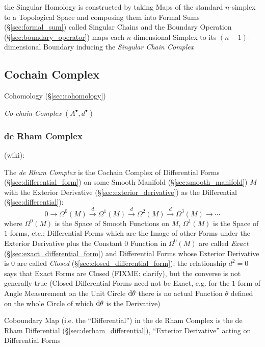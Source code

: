 the Singular Homology is constructed by taking Maps of the standard $n$-simplex
to a Topological Space and composing them into Formal
Sums (\S\ref{sec:formal_sum}) called Singular Chains and the Boundary Operation
(\S\ref{sec:boundary_operator}) maps each $n$-dimensional Simplex to its
$(n-1)$-dimensional Boundary inducing the \emph{Singular Chain Complex}



\subsection{Cochain Complex}\label{sec:cochain_complex}

\fist Cohomology (\S\ref{sec:cohomology})

\emph{Co-chain Complex} $(A^\bullet, d^\bullet)$



\subsubsection{de Rham Complex}\label{sec:derham_complex}

(wiki):

The \emph{de Rham Complex} is the Cochain Complex of Differential Forms
(\S\ref{sec:differential_form}) on some Smooth Manifold
(\S\ref{sec:smooth_manifold}) $M$ with the Exterior Derivative
(\S\ref{sec:exterior_derivative}) as the Differential
(\S\ref{sec:differential}):
\[
  0 \rightarrow \Omega^0(M) \xrightarrow{d} \Omega^1(M) \xrightarrow{d}
  \Omega^2(M) \xrightarrow{d} \Omega^3(M) \rightarrow \cdots
\]
where $\Omega^0(M)$ is the Space of Smooth Functions on $M$, $\Omega^1(M)$ is
the Space of $1$-forms, etc.; Differential Forms which are the Image of other
Forms under the Exterior Derivative plus the Constant $0$ Function in
$\Omega^0(M)$ are called \emph{Exact} (\S\ref{sec:exact_differential_form}) and
Differential Forms whose Exterior Derivative is $0$ are called \emph{Closed}
(\S\ref{sec:closed_differential_form}); the relationship $d^2 = 0$ says that
Exact Forms are Closed (FIXME: clarify), but the converse is not generally true
(Closed Differential Forms need not be Exact, e.g. for the $1$-form of Angle
Measurement on the Unit Circle $\mathrm{d}\theta$ there is no actual Function
$\theta$ defined on the whole Circle of which $\mathrm{d}\theta$ is the
Derivative)

Coboundary Map (i.e. the ``Differential'') in the de Rham Complex is the de Rham
Differential (\S\ref{sec:derham_differential}), ``Exterior Derivative'' acting
on Differential Forms

